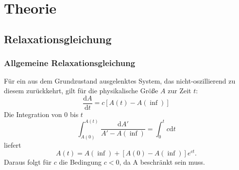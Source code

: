 
\section{Theorie}
\label{sec:Theorie}
\subsection{Relaxationsgleichung}
\subsubsection{Allgemeine Relaxationsgleichung}
Für ein aus dem Grundzustand ausgelenktes System, das nicht-oszillierend zu diesem zurückkehrt, gilt für die physikalische Größe $A$ zur Zeit $t$:
\begin{equation}
\frac{\mathrm{d}A}{\mathrm{d}t}=c\left[A(t)-A(\inf)\right]
\end{equation}
Die Integration von $0$ bis $t$
\[
\int_{A(0)}^{A(t)} \frac{\mathrm{d}A'}{A' - A(\inf)}=\int_0^tc\mathrm{d}t
\]
liefert 
\begin{equation}
A(t) = A(\inf) + \left[A(0)-A(\inf)\right]e^{ct}\text{.}
\end{equation}
Daraus folgt für $c$ die Bedingung $c<0$, da A beschränkt sein muss.
